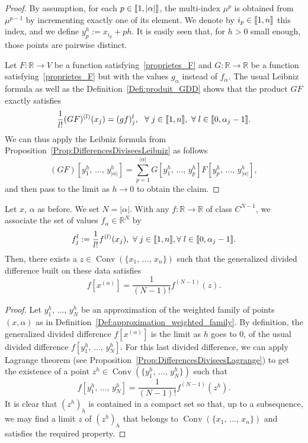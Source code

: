 \documentclass[AHL,Unicode,longabstracts]{cedram}
\DeclareMathOperator{\Conv}{Conv}
\newcommand{\llbracket}{\mathopen{[\mkern -2.7mu[}}
\newcommand{\rrbracket}{\mathclose{]\mkern -2.7mu]}}
\newcommand{\inter}[2]{\llbracket #1,#2 \rrbracket}
\newcommand{\R}{\mathbb{R}}
\let\oldforall\forall
\renewcommand*{\forall}{\mathrel{\oldforall}}
\begin{document}
\begin{proof}
By assumption, for each $p\in \inter{1}{|\alpha|}$, the multi-index $\mu^{p}$ is obtained from $\mu^{p-1}$ by incrementing exactly one of its element. We denote by $i_p\in \inter{1}{n}$ this index, and we define $y_p^h:=x_{i_p}+ph$. It is easily seen that, for $h>0$ small enough, those points are pairwise distinct.

Let $F:\R\to V$ be a function satisfying~\eqref{proprietes_F} and $G:\R\to \R$ be a function satisfying~\eqref{proprietes_F} but with the values $g_{\alpha}$ instead of $f_{\alpha}$. The usual Leibniz formula as well as the Definition~\ref{Defi:produit_GDD} shows that the product $GF$ exactly satisfies
\[
\frac{1}{l!}(GF)^{(l)}(x_j) = (gf)_j^l, \ \ \forall j\in \inter{1}{n},\ \forall l\in \inter{0}{\alpha_j-1}.
\]
We can thus apply the Leibniz formula from Proposition~\ref{Prop:DifferencesDiviseesLeibniz} as follows
\[
(GF)\left[y_1^h,\,\dotsc,\,y_{|\alpha|}^h\right] = \sum_{p=1}^{|\alpha|} G\left[y_1^h,\,\dotsc,\,y_{p}^h\right] F\left[y_p^h,\,\dotsc,\,y_{|\alpha|}^h\right],
\]
and then pass to the limit as $h\to 0$ to obtain the claim.
\end{proof}
\pagebreak

\begin{prop}
Let $x$, $\alpha$ as before. We set $N=|\alpha|$. With any $f:\R\to \R$ of class $C^{N-1}$, we associate the set of values $f_\alpha\in \R^{N}$ by
\[
f_j^l:=\frac{1}{l!} f^{(l)}(x_j), \ \forall j\in \inter{1}{n}, \forall l\in \inter{0}{\alpha_j-1}.
\]
Then, there exists a $z\in \Conv(\{x_1,\,\dotsc,\,x_n\})$ such that the generalized divided difference built on these data satisfies
\[
f\left[x^{(\alpha)}\right] = \frac{1}{(N-1)!} f^{(N-1)}(z).
\]
\end{prop}

\begin{proof}
Let $y_1^h,\,\dotsc,\,y_N^h$ be an approximation of the weighted family of points $(x,\alpha)$ as in Definition~\ref{Def:approximation_weighted_family}. By definition, the generalized divided difference $f[x^{(\alpha)}]$ is the limit as $h$ goes to $0$, of the usual divided difference $f[y_1^h,\,\dotsc,\,y_N^h]$. For this last divided difference, we can apply Lagrange theorem (see Proposition~\ref{Prop:DifferencesDiviseesLagrange}) to get the existence of a point $z^h\in \Conv (\{y_1^h,\,\dotsc,\,y_N^h\})$ such that
\[
f\left[y_1^h,\,\dotsc,\,y_N^h\right]=\frac{1}{(N-1)!} f^{(N-1)}(z^h).
\]
It is clear that $(z^h)_h$ is contained in a compact set so that, up to a subsequence, we may find a limit $z$ of $(z^h)_h$ that belongs to $\Conv(\{x_1,\,\dotsc,\,x_n\})$ and satisfies the required property.
\end{proof}
\end{document}
